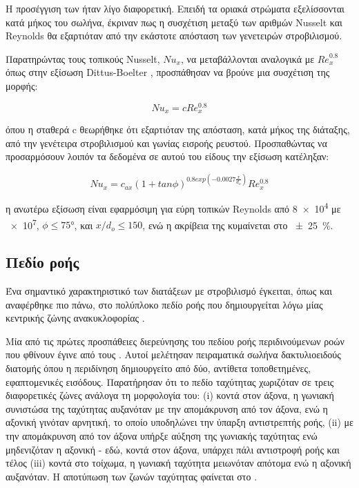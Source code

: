 Η προσέγγιση των \citeauthor{1971_Narezhnyy} \cite{1971_Narezhnyy} ήταν λίγο διαφορετική. Επειδή τα οριακά στρώματα εξελίσσονται κατά μήκος του σωλήνα, έκριναν πως η συσχέτιση μεταξύ των αριθμών Nusselt και Reynolds θα εξαρτιόταν από την εκάστοτε απόσταση των γενετειρών στροβιλισμού.

Παρατηρώντας τους τοπικούς Nusselt, $Nu_x$, να μεταβάλλονται αναλογικά με ${Re}_x^{0.8}$ όπως στην εξίσωση Dittus-Boelter \cite{1930_Dittus}, προσπάθησαν να βρούνε μια συσχέτιση της μορφής:

\begin{equation}\label{eq:dittuss}
Nu_x = c Re_x^{0.8}
\end{equation}

\noindent όπου η σταθερά c θεωρήθηκε ότι εξαρτιόταν της απόσταση, κατά μήκος της διάταξης, από την γενέτειρα στροβιλισμού και γωνίας εισροής ρευστού. Προσπαθώντας να προσαρμόσουν λοιπόν τα δεδομένα σε αυτού του είδους την εξίσωση κατέληξαν:

\begin{equation}
Nu_x = c_{ax} \left( 1 + tan \phi \right) ^ {0.8 exp\left( -0.0027\frac{x}{d_o} \right)} Re_x^{0.8}
\end{equation}

\noindent η ανωτέρω εξίσωση είναι εφαρμόσιμη για εύρη τοπικών Reynolds από \num{8e+4} με \num{e+7}, $\phi \le \ang{75}$, και $x/d_o \le 150$, ενώ η ακρίβεια της κυμαίνεται στο \qty{\pm 25}{\percent}.

\subsection{Πεδίο ροής}

\noindent Ένα σημαντικό χαρακτηριστικό των διατάξεων με στροβιλισμό έγκειται, όπως και αναφέρθηκε πιο πάνω, στο πολύπλοκο πεδίο ροής που δημιουργείται λόγω μίας κεντρικής ζώνης ανακυκλοφορίας \cite{2003_AlAbdeli}.

\noindent Μία από τις πρώτες προσπάθειες διερεύνησης του πεδίου ροής περιδινούμενων ροών που φθίνουν έγινε από τους \citeauthor{1961_Nissan} \cite{1961_Nissan}. Αυτοί μελέτησαν πειραματικά σωλήνα δακτυλιοειδούς διατομής όπου η περιδίνηση δημιουργείτο από δύο, αντίθετα τοποθετημένες, εφαπτομενικές εισόδους. Παρατήρησαν ότι το πεδίο ταχύτητας χωριζόταν σε τρεις διαφορετικές ζώνες ανάλογα τη μορφολογία του: (i) κοντά στον άξονα, η γωνιακή συνιστώσα της ταχύτητας αυξανόταν με την απομάκρυνση από τον άξονα, ενώ η αξονική γινόταν αρνητική, το οποίο υποδηλώνει την ύπαρξη αντιστρεπτής ροής, (ii) με την απομάκρυνση από τον άξονα υπήρξε αύξηση της γωνιακής ταχύτητας ενώ μηδενιζόταν η αξονική - εδώ, κοντά στον άξονα, υπάρχει πάλι αντιστροφή ροής και τέλος (iii) κοντά στο τοίχωμα, η γωνιακή ταχύτητα μειωνόταν απότομα ενώ η αξονική αυξανόταν. Η αποτύπωση των ζωνών ταχύτητας φαίνεται στο .

